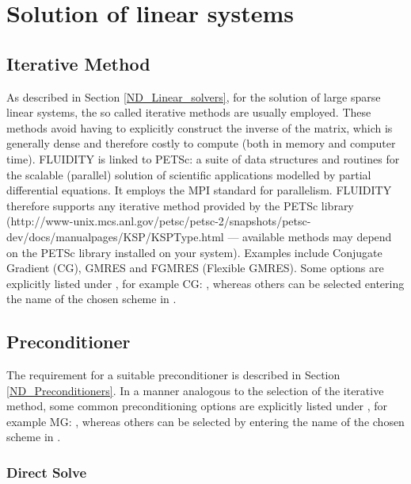\section{Solution of linear systems}\label{sec:Solve}

\subsection{Iterative Method}
As described in Section \ref{ND_Linear_solvers}, for the solution of large sparse linear systems, the so called iterative methods are usually employed. These methods avoid having to explicitly construct the inverse of the matrix, which is generally dense and therefore costly to compute (both in memory and computer time). FLUIDITY is linked to PETSc: a suite of data structures and routines for the scalable (parallel) solution of scientific applications modelled by partial differential equations.  It employs the MPI standard for parallelism. FLUIDITY therefore supports any iterative method provided by the PETSc library (http://www-unix.mcs.anl.gov/petsc/petsc-2/snapshots/petsc-dev/docs/manualpages/KSP/KSPType.html --- available methods may depend on the PETSc library installed on your system). Examples include Conjugate Gradient (CG), GMRES and FGMRES (Flexible GMRES). Some options are explicitly listed under , for example CG: , whereas
others can be selected entering the name of the chosen scheme in .

\subsection{Preconditioner}

The requirement for a suitable preconditioner is described in Section \ref{ND_Preconditioners}. In a manner analogous to the selection of the iterative method, some common preconditioning options are explicitly listed under , for example MG: , whereas others can be selected by entering the name of the chosen scheme in .

\subsubsection{Direct Solve}

